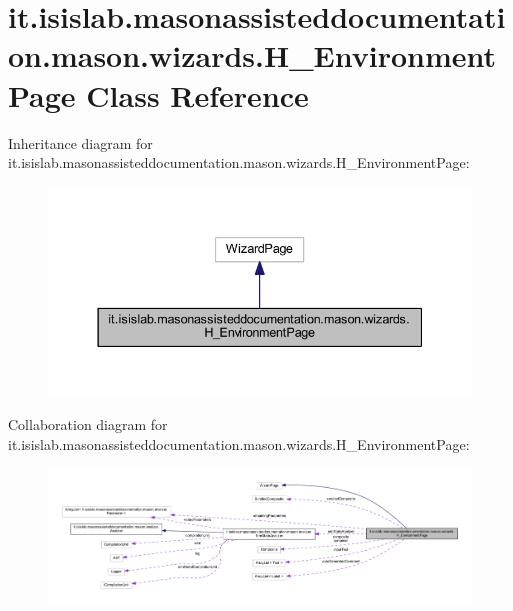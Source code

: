 \hypertarget{classit_1_1isislab_1_1masonassisteddocumentation_1_1mason_1_1wizards_1_1_h___environment_page}{\section{it.\-isislab.\-masonassisteddocumentation.\-mason.\-wizards.\-H\-\_\-\-Environment\-Page Class Reference}
\label{classit_1_1isislab_1_1masonassisteddocumentation_1_1mason_1_1wizards_1_1_h___environment_page}
}


Inheritance diagram for it.\-isislab.\-masonassisteddocumentation.\-mason.\-wizards.\-H\-\_\-\-Environment\-Page\-:\nopagebreak
\begin{figure}[H]
\begin{center}
\leavevmode
\includegraphics[width=337pt]{classit_1_1isislab_1_1masonassisteddocumentation_1_1mason_1_1wizards_1_1_h___environment_page__inherit__graph}
\end{center}
\end{figure}


Collaboration diagram for it.\-isislab.\-masonassisteddocumentation.\-mason.\-wizards.\-H\-\_\-\-Environment\-Page\-:\nopagebreak
\begin{figure}[H]
\begin{center}
\leavevmode
\includegraphics[width=350pt]{classit_1_1isislab_1_1masonassisteddocumentation_1_1mason_1_1wizards_1_1_h___environment_page__coll__graph}
\end{center}
\end{figure}
